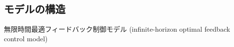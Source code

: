 \subsection{モデルの構造}無限時間最適フィードバック制御モデル (infinite-horizon optimal feedback control model) \cite{Qian2013-zy}